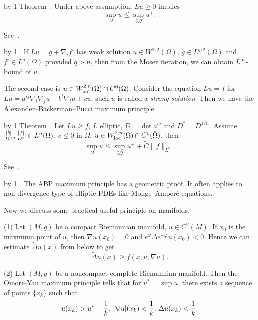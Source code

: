 \advance\propcount by 1
\proclaim Theorem~\propnumber.
Under above assumption, $Lu\geq 0$ implies
$$\sup_\Omega u\leq\sup_{\partial\Omega}u^+.$$

\demo
See~\cite[Theorem 8.1]{G-T}.
\enddemo

\advance\propcount by 1
.
If $Lu=g+\nabla_if^i$ has weak solution $u\in W^{1,2}(\Omega)$, $g\in L^{q/2}(\Omega)$ and $f^i\in L^q(\Omega)$ provided $q>n$, then from the Moser iteration, we can obtain $L^\infty$-bound of $u$.
\medskip

The second case is $u\in W^{2,n}_{\rm loc}(\Omega)\cap C^0(\bar\Omega)$.
Consider the equation $Lu=f$ for $Lu=a^{ij}\nabla_i\nabla_ju+b^i\nabla_iu+cu$, such $u$ is called a {\it strong solution}.
Then we have the Alexander--Backerman--Pucci maximum principle.

\advance\propcount by 1
\proclaim Theorem~\propnumber.
Let $Lu\geq f$, $L$ elliptic, $D=\det{a^{ij}}$ and $D^*=D^{1/n}$.
Assume ${|b|\over D^*},{|f|\over D^*}\in L^n(\Omega)$, $c\leq 0$ in $\Omega$, $u\in W^{2,n}_{\rm loc}(\Omega)\cap C^0(\bar\Omega)$, then
$$\sup_\Omega u\leq\sup_{\partial\Omega}u^++\tilde{C}\|f\|_{L^n}.$$

\demo
See~\cite[Theorem 9.1]{G-T}.
\enddemo

\advance\propcount by 1
.
The ABP maximum principle has a geometric proof.
It often applies to non-divergence type of elliptic PDEs like Monge--Amper\'e equations.
\medskip

Now we discuss some practical useful principle on manifolds.
\smallskip
\item {(1)} Let $(M,g)$ be a compact Riemannian manifold, $u\in C^2(M)$.
If $x_0$ is the maximum point of $u$, then $\nabla u(x_0)=0$ and $e^\varphi\Delta e^{-\varphi}u(x_0)<0$.
Hence we can estimate $\tilde{\Delta}u(x)$ from below to get
$$\tilde{\Delta}u(x)\geq f(x,u,\nabla u).$$
\item {(2)} Let $(M,g)$ be a noncompact complete Riemannian manifold.
Then the Omori--Yau maximum principle tells that for $u^*=\sup u$, there exists a sequence of points $\{x_k\}$ such that
$$u(x_k)>u^*-{1\over k}.\ |\nabla u|(x_k)<{1\over k}.\ \Delta u(x_k)<{1\over k}.$$

\endsection